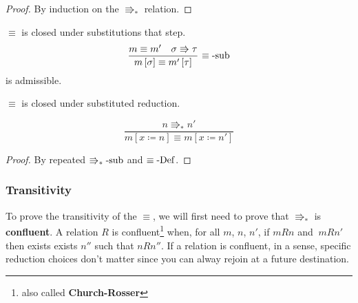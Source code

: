\begin{proof}
By induction on the $\Rrightarrow_{\ast}$ relation.
\end{proof}
\begin{lem}
$\equiv$ is closed under substitutions that step.
\[
\frac{m\equiv m'\quad\sigma\Rrightarrow\tau}{m\left[\sigma\right]\equiv m'\left[\tau\right]}\,\operatorname{\equiv-sub}
\]
is admissible.
\end{lem}
 
\begin{cor}
$\equiv$ is closed under substituted reduction.
\end{cor}
 
\[
\frac{n\Rrightarrow_{\ast}n'}{m\left[x\coloneqq n\right]\equiv m\left[x\coloneqq n'\right]}
\]
 
\begin{proof}
By repeated $\operatorname{\Rrightarrow_{\ast}-sub}$ and $\equiv\operatorname{-Def}$.
\end{proof}
 
\subsubsection{Transitivity}
 
To prove the transitivity of the $\equiv$, we will first need to prove that \textbf{$\Rrightarrow_{\ast}$ }is \textbf{confluent}.
A relation $R$ is confluent\footnote{also called \textbf{Church-Rosser}} when, for all $m$, $n$, $n'$, if $mRn$ and $\:mRn'$ then exists exists $n''$ such that $nRn''$. %
If a relation is confluent, in a sense, specific reduction choices don't matter since you can alway rejoin at a future destination.
 
